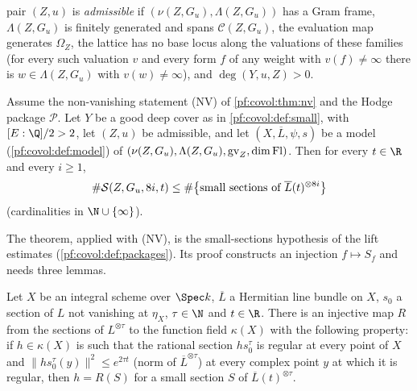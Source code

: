 \begin{definition}
pair $(Z,u)$ is \emph{admissible} if $(\nu(Z,G_u),\Lambda(Z,G_u))$ has a Gram frame, $\Lambda(Z,G_u)$ is
finitely generated and spans $\mathcal C(Z,G_u)$, the evaluation map generates $\Omega_Z$, the lattice has
no base locus along the valuations of these families (for every such valuation $v$ and every form $f$ of
any weight with $v(f)\ne\infty$ there is $w\in\Lambda(Z,G_u)$ with $v(w)\ne\infty$), and $\deg(Y,u,Z)>0$.
%
%
%
\end{definition}

\begin{theorem}\label{pf:covol:thm:small}
Assume the non-vanishing statement (NV) of \cref{pf:covol:thm:nv} and the Hodge package $\mathcal P$. Let
$Y$ be a good deep cover as in \cref{pf:covol:def:small}, with $[E:\Q]/2>2$, let $(Z,u)$ be admissible,
and let $(X,\overline L,\psi,s)$ be a model (\cref{pf:covol:def:model}) of
$(\nu(Z,G_u),\Lambda(Z,G_u),\operatorname{gv}_Z,\dim\mathrm{Fl})$. Then for every $t\in\R$ and every $i\ge1$,
\[
\#\mathcal{S}(Z,G_u,8i,t)\le\#\bigl\{\text{small sections of }\overline L(t)^{\otimes8i}\bigr\}
\]
(cardinalities in $\N\cup\{\infty\}$).
\end{theorem}

The theorem, applied with (NV), is the small-sections hypothesis of the lift estimates
(\cref{pf:covol:def:packages}). Its proof constructs an injection $f\mapsto S_f$ and needs three lemmas.

\begin{lemma}\label{pf:covol:lem:ratsmall}
Let $X$ be an integral scheme over $\Spec k$, $\overline L$ a Hermitian line bundle on $X$, $s_0$ a section
of $L$ not vanishing at $\eta_X$, $\tau\in\N$ and $t\in\R$. There is an injective map $R$ from the sections
of $L^{\otimes\tau}$ to the function field $\kappa(X)$ with the following property: if $h\in\kappa(X)$ is
such that the rational section $hs_0^\tau$ is regular at every point of $X$ and
$\|hs_0^\tau(y)\|^2\le e^{2\tau t}$ (norm of $\overline L^{\otimes\tau}$) at every complex point $y$ at which
it is regular, then $h=R(S)$ for a small section $S$ of $\overline L(t)^{\otimes\tau}$.
\end{lemma}

